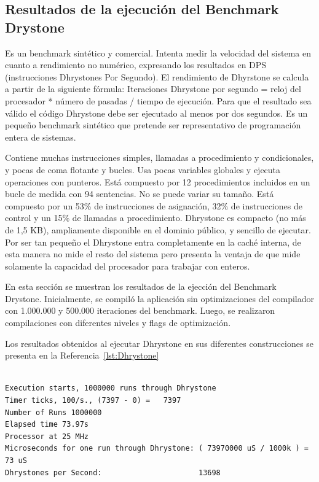 \newpage

		\subsection{Resultados de la ejecución del Benchmark Drystone}
		
		Es un benchmark sintético y comercial. Intenta medir la velocidad del sistema en cuanto a rendimiento no numérico, expresando los
		resultados en DPS (instrucciones Dhrystones Por Segundo). El rendimiento de Dhyrstone se calcula a partir de la siguiente fórmula: Iteraciones
		Dhrystone por segundo = reloj del procesador * número de pasadas / tiempo de ejecución. Para que el resultado sea válido el código Dhrystone debe
		ser ejecutado al menos por dos segundos. Es un pequeño benchmark sintético que pretende ser representativo de programación entera de
		sistemas. 
		
		Contiene muchas instrucciones simples, llamadas a procedimiento y condicionales, y pocas de coma flotante y bucles. Usa pocas variables globales y
		ejecuta operaciones con punteros. Está compuesto por 12 procedimientos incluidos en un bucle de medida con 94 sentencias. No se puede variar su
		tamaño. Está compuesto por un 53\% de instrucciones de asignación, 32\% de instrucciones de control y un 15\% de llamadas a procedimiento.
		Dhrystone es compacto (no más de 1,5 KB), ampliamente disponible en el dominio público, y sencillo de ejecutar. Por ser tan pequeño el Dhrystone
		entra completamente en la caché interna, de esta manera no mide el resto del sistema pero presenta la ventaja de que mide solamente la capacidad
		del procesador para trabajar con enteros.

		En esta sección se muestran los resultados de la ejección del Benchmark Drystone. Inicialmente, se compiló la aplicación sin optimizaciones del
		compilador con 1.000.000 y 500.000 iteraciones del benchmark. Luego, se realizaron compilaciones con diferentes niveles y flags de optimización. 

		Los resultados obtenidos al ejecutar Dhrystone en sus diferentes construcciones se presenta en la Referencia~\ref{lst:Dhrystone}

\begin{lstlisting}[frame=single,caption={Sin optimizaciones },label={lst:Dhrystone},breaklines]

Execution starts, 1000000 runs through Dhrystone
Timer ticks, 100/s., (7397 - 0) =	7397
Number of Runs 1000000
Elapsed time 73.97s
Processor at 25 MHz
Microseconds for one run through Dhrystone: ( 73970000 uS / 1000k ) = 73 uS
Dhrystones per Second:                      13698 
\end{lstlisting}

